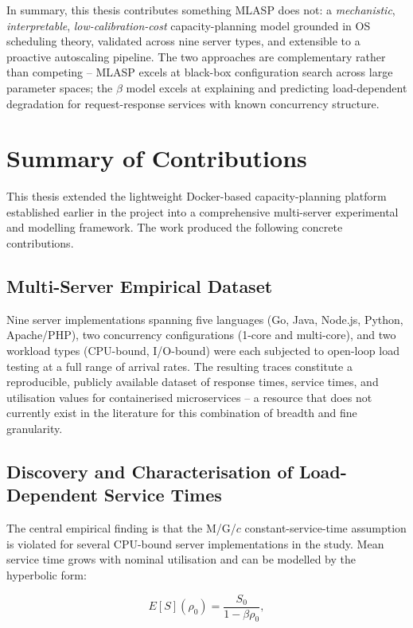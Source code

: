 In summary, this thesis contributes something MLASP does not: a \emph{mechanistic}, \emph{interpretable}, \emph{low-calibration-cost} capacity-planning model grounded in OS scheduling theory, validated across nine server types, and extensible to a proactive autoscaling pipeline. The two approaches are complementary rather than competing -- MLASP excels at black-box configuration search across large parameter spaces; the $\beta$ model excels at explaining and predicting load-dependent degradation for request-response services with known concurrency structure.

\section{Summary of Contributions}

This thesis extended the lightweight Docker-based capacity-planning platform established earlier in the project into a comprehensive multi-server experimental and modelling framework. The work produced the following concrete contributions.

\subsection{Multi-Server Empirical Dataset}

Nine server implementations spanning five languages (Go, Java, Node.js, Python, Apache/PHP), two concurrency configurations (1-core and multi-core), and two workload types (CPU-bound, I/O-bound) were each subjected to open-loop load testing at a full range of arrival rates. The resulting traces constitute a reproducible, publicly available dataset of response times, service times, and utilisation values for containerised microservices -- a resource that does not currently exist in the literature for this combination of breadth and fine granularity.

\subsection{Discovery and Characterisation of Load-Dependent Service Times}

The central empirical finding is that the M/G/$c$ constant-service-time assumption is violated for several CPU-bound server implementations in the study. Mean service time grows with nominal utilisation and can be modelled by the hyperbolic form:

\[
E[S](\rho_0) = \frac{S_0}{1 - \beta\rho_0},
\]

